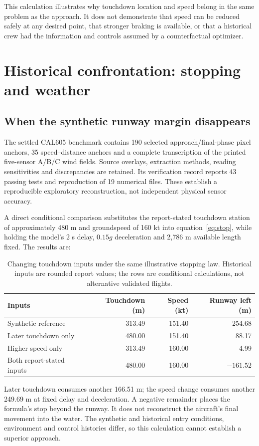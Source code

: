 This calculation illustrates why touchdown location and speed belong in the same problem as the approach. It does not demonstrate that speed can be reduced safely at any desired point, that stronger braking is available, or that a historical crew had the information and controls assumed by a counterfactual optimizer.



\section{Historical confrontation: stopping and weather}
\label{sec:weather}
\subsection{When the synthetic runway margin disappears}
The settled CAL605 benchmark contains 190 selected approach/final-phase pixel anchors, 35 speed--distance anchors and a complete transcription of the printed five-sensor A/B/C wind fields. Source overlays, extraction methods, reading sensitivities and discrepancies are retained. Its verification record reports 43 passing tests and reproduction of 19 numerical files. These establish a reproducible exploratory reconstruction, not independent physical sensor accuracy.

A direct conditional comparison substitutes the report-stated touchdown station of approximately 480 m and groundspeed of 160 kt into equation~\eqref{eq:stop}, while holding the model's 2 s delay, $0.15g$ deceleration and 2,786 m available length fixed. The results are:
\begin{table}[H]
\centering\small
\caption{Changing touchdown inputs under the same illustrative stopping law. Historical inputs are rounded report values; the rows are conditional calculations, not alternative validated flights.}
\begin{tabular}{@{}lrrr@{}}
\toprule
Inputs & Touchdown (m) & Speed (kt) & Runway left (m)\\
\midrule
Synthetic reference & 313.49 & 151.40 & 254.68\\
Later touchdown only & 480.00 & 151.40 & 88.17\\
Higher speed only & 313.49 & 160.00 & 4.99\\
Both report-stated inputs & 480.00 & 160.00 & $-161.52$\\
\bottomrule
\end{tabular}
\end{table}
Later touchdown consumes another 166.51 m; the speed change consumes another 249.69 m at fixed delay and deceleration. A negative remainder places the formula's stop beyond the runway. It does not reconstruct the aircraft's final movement into the water. The synthetic and historical entry conditions, environment and control histories differ, so this calculation cannot establish a superior approach.

